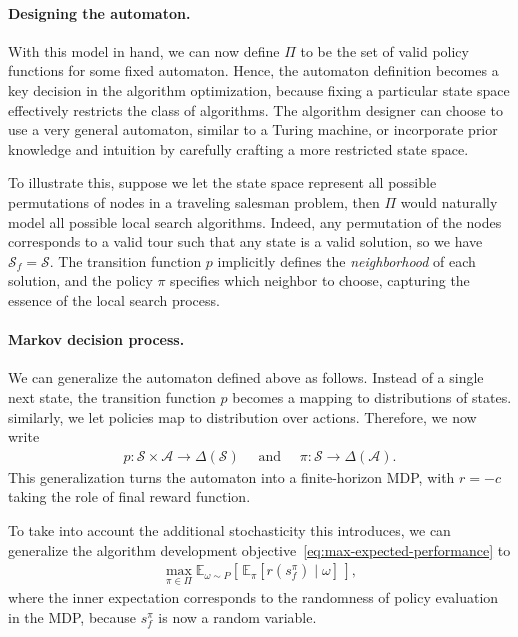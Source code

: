\documentclass{report}
\theoremstyle{definition}
\theoremstyle{plain}
\begin{document}
\paragraph{Designing the automaton.}

With this model in hand, we can now define $\Pi$ to be the set of valid policy
functions for some fixed automaton.
%
Hence, the automaton definition becomes a key decision in the algorithm
optimization, because fixing a particular state space effectively restricts the
class of algorithms.
%
The algorithm designer can choose to use a very general automaton, similar to a
Turing machine, or incorporate prior knowledge and intuition by carefully
crafting a more restricted state space.

To illustrate this, suppose we let the state space represent all possible
permutations of nodes in a traveling salesman problem, then $\Pi$ would
naturally model all possible local search algorithms.
%
Indeed, any permutation of the nodes corresponds to a valid tour such that any
state is a valid solution, so we have $\mathcal{S}_f = \mathcal{S}$.
%
The transition function $p$ implicitly defines the \emph{neighborhood} of each
solution, and the policy $\pi$ specifies which neighbor to choose, capturing the
essence of the local search process.

\paragraph{Markov decision process.}
We can generalize the automaton defined above as follows.
Instead of a single next state, the transition function $p$ becomes a mapping to
distributions of states.
similarly, we let policies map to distribution over actions.
Therefore, we now write
\begin{align*}
  p : \mathcal{S} \times \mathcal{A} \rightarrow \Delta(\mathcal{S}) \quad \text{ and }
  \quad \pi : \mathcal{S} \rightarrow \Delta(\mathcal{A}) .
\end{align*}
%
This generalization turns the automaton into a finite-horizon MDP, with $r = {-c}$
taking the role of final reward function.

To take into account the additional stochasticity this introduces, we can generalize the algorithm development objective~\eqref{eq:max-expected-performance} to
\begin{align}\label{eq:max-mdp-performance}
  \max_{\pi \in \Pi} \mathbb{E}_{\omega \sim P} \left[ \, \mathbb{E}_\pi \left[ r(s_f^\pi) \mid \omega \right] \, \right] ,
\end{align}
where the inner expectation corresponds to the randomness of policy evaluation
in the MDP, because $s_f^\pi$ is now a random variable.
\end{document}
